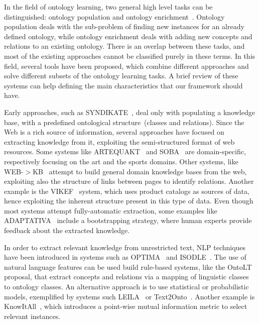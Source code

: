       In the field of ontology learning, two general high level tasks can be distinguished:
      ontology population and ontology enrichment~\cite{petasis2011ontology}.
      Ontology population deals with the
      sub-problem of finding new instances for an already defined ontology, while
      ontology enrichment deals with adding new concepts and relations to an existing
      ontology. There is an overlap between these tasks, and most of the existing
      approaches cannot be classified purely in these terms.  
      In this field, several tools have been proposed, which
      combine different approaches and solve different subsets of the ontology
      learning tasks. A brief review of these systems can help defining the 
      main characteristics that our framework should have.
  
      Early approaches, such as SYNDIKATE~\cite{syndikate}, deal only with populating a 
      knowledge base, with a predefined ontological structure~(classes and relations).
      Since the Web is a rich source of information, several approaches have focused on extracting knowledge
      from it, exploiting the semi-structured format of web resources.
      Some systems like ARTEQUAKT~\cite{artequakt} and SOBA~\cite{soba} are domain-specific,
      respectively focusing on the art and the sports domains.
      Other systems, like WEB-$>$KB~\cite{webkb} attempt to build general domain knowledge bases from the 
      web, exploiting also the structure of links between pages to identify relations.
      Another example is the VIKEF~\cite{vikef} system, which uses product catalogs as sources of data, hence exploiting the
      inherent structure present in this type of data.
      Even though most systems attempt fully-automatic extraction, some examples like ADAPTATIVA~\cite{adaptativa} include
      a bootstrapping strategy, where human experts provide feedback about the extracted knowledge.
  
      In order to extract relevant knowledge from unrestricted text, NLP techniques have
      been introduced in systems such as OPTIMA~\cite{optima} and ISODLE~\cite{isolde}.
      The use of natural language features can be used build rule-based systems,
      like the OntoLT~\cite{buitelaar2004ontolt} proposal, that extract concepts and
    relations via a mapping of linguistic classes to ontology classes.
      An alternative approach is to use statistical or probabilistic models,
      exemplified by systems such LEILA~\cite{leila} or Text2Onto~\cite{cimiano2005text2onto}.    
      Another example is KnowItAll~\cite{knowitall}, which introduces a point-wise mutual information
      metric to select relevant instances.
    
